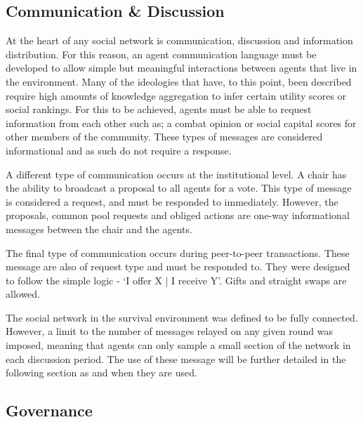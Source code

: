 \subsection{Communication \& Discussion}\label{sec: comms}


At the heart of any social network is communication, discussion and information distribution. For this reason, an agent communication language must be developed to allow simple but meaningful interactions between agents that live in the environment. Many of the ideologies that have, to this point, been described require high amounts of knowledge aggregation to infer certain utility scores or social rankings. For this to be achieved, agents must be able to request information from each other such as; a combat opinion or social capital scores for other members of the community. These types of messages are considered informational and as such do not require a response. 

A different type of communication occurs at the institutional level. A chair has the ability to broadcast a proposal to all agents for a vote. This type of message is considered a request, and must be responded to immediately. However, the proposals, common pool requests and obliged actions are one-way informational messages between the chair and the agents. 

The final type of communication occurs during peer-to-peer transactions. These message are also of request type and must be responded to. They were designed to follow the simple logic - `I offer X | I receive Y'. Gifts and straight swaps are allowed. 

The social network in the survival environment was defined to be fully connected. However, a limit to the number of messages relayed on any given round was imposed, meaning that agents can only sample a small section of the network in each discussion period. The use of these message will be further detailed in the following section as and when they are used. 

\subsection{Governance}\label{sec: gov}


